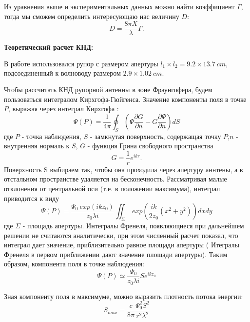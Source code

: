 Из уравнения выше и экспериментальных данных можно найти коэффициент $\Gamma$, тогда мы сможем определить интересующаю
нас величину $D$:
\begin{equation}
    D = \frac{8 \pi X}{\lambda} \Gamma.
    \label{eq:14}
\end{equation}



\textbf{Теоретический расчет КНД:}

В работе использовался рупор с размером апертуры $l_1\times l_2 = 9.2 \times 13.7 ~ cm$, подсоединенный к волноводу размером
$ 2.9 \times 1.02~cm. $

Чтобы рассчитать КНД рупорной антенны в зоне Фраунгофера, будем пользоваться интегралом Кирхгофа-Гюйгенса. Значение
компоненты поля в точке $P$, выражая через интеграл Кирхгофа :
\begin{equation}
    \Psi(P) = \frac{1}{4 \pi} \oint_{S}( \Psi \frac{\partial G}{\partial n} - G \frac{\partial \Psi}{\partial n})dS 
    \label{eq:1:1}
\end{equation}
где $P$ - точка наблюдения, $S$ - замкнутая поверхность, содержащая точку $P$,$n$ - внутренняя нормаль к $S$, $G$ - функция Грина свободного
пространства $$ G = \frac{1}{r} e^{i k r}. $$ 
Поверхность S выбираем так, чтобы она проходила через апертуру аннтены, а в отстальном пространстве удаляется на
бесконечность.
Рассматривая малые отклонения от центральной оси (т.е. в положении максимума), интеграл приводится к виду
\begin{equation}
    \Psi(P) = \frac{\Psi_0 ~exp(i k z_0) }{z_0 \lambda i} \iint_{\Sigma}~exp(\frac{i k}{2 z_0}(x^2+y^2))dxdy
    \label{eq:1:2}
\end{equation}
где $\Sigma$ - площадь апертуры. Интегралы Френеля, появляющиеся при дальнейшем решении не считаются аналитически, при
этом численный расчет показал, что интеграл дает значение, приблизительно равное площади апертуры ( Итегралы Френеля в
первом приближении дают значение площади апертуры). Таким образом, компонента поля в точке наблюдения:
\begin{equation}
    \Psi(P) \simeq \frac{\Psi_0}{z_0 \lambda i} S  e^{i k z_0}  
    \label{eq:1:3}
\end{equation}

Зная компоненту поля в максимуме, можно выразить плотность потока энергии:
\begin{equation}
    S_{max} = \frac{c}{8 \pi} \frac{\Psi_0^2 S^2}{r^2 \lambda^2} 
    \label{eq:1:4}
\end{equation}

